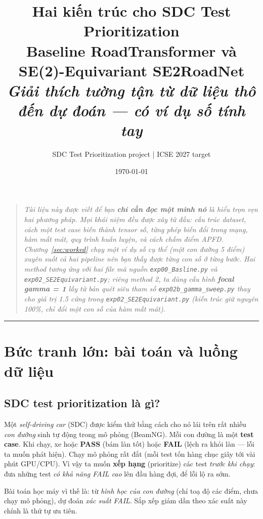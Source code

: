 \documentclass[11pt]{article}
\title{\vspace{-1.2cm}\textbf{Hai kiến trúc cho SDC Test Prioritization}\\[4pt]
\large Baseline \textcolor{cA}{RoadTransformer} \;và\; SE(2)-Equivariant
\textcolor{cB}{SE2RoadNet}\\[2pt]
\normalsize\textit{Giải thích tường tận từ dữ liệu thô đến dự đoán --- có ví dụ số tính tay}}
\author{\normalsize SDC Test Prioritization project \;|\; ICSE 2027 target}
\date{\normalsize\today}
\newcommand{\code}[1]{\textcolor{cInk}{\texttt{#1}}}
\newcommand{\fileA}{\code{exp00\_Basline.py}}
\newcommand{\fileB}{\code{exp02\_SE2Equivariant.py}}
\newcommand{\fileBb}{\code{exp02b\_gamma\_sweep.py}}
\theoremstyle{definition}
\begin{document}
\maketitle
\thispagestyle{empty}

\begin{quote}\small\itshape
Tài liệu này được viết để bạn \textbf{chỉ cần đọc một mình nó} là hiểu trọn vẹn
hai phương pháp. Mọi khái niệm đều được xây từ đầu: cấu trúc dataset, cách một
test case biến thành tensor số, từng phép biến đổi trong mạng, hàm mất mát, quy
trình huấn luyện, và cách chấm điểm APFD. Chương~\ref{sec:worked} chạy \emph{một
ví dụ số cụ thể} (một con đường 5 điểm) xuyên suốt cả hai pipeline nên bạn thấy
được từng con số ở từng bước. Hai method tương ứng với hai file mã nguồn
\fileA{} và \fileB{}; riêng method 2, ta dùng cấu hình \textbf{focal gamma = 1}
lấy từ bản quét siêu tham số \fileBb{} thay cho giá trị 1.5 cứng trong \fileB{}
(kiến trúc giữ nguyên 100\%, chỉ đổi một con số của hàm mất mát).
\end{quote}

\tableofcontents
\vspace{4mm}
\hrule
\vspace{4mm}

\section{Bức tranh lớn: bài toán và luồng dữ liệu}
\label{sec:overview}

\subsection{SDC test prioritization là gì?}
Một \emph{self-driving car} (SDC) được kiểm thử bằng cách cho nó lái trên rất
nhiều \emph{con đường} sinh tự động trong mô phỏng (BeamNG). Mỗi con đường là
một \textbf{test case}. Khi chạy, xe hoặc \textbf{PASS} (bám làn tốt) hoặc
\textbf{FAIL} (lệch ra khỏi làn --- lỗi ta muốn phát hiện). Chạy mô phỏng rất
đắt (mỗi test tốn hàng chục giây tới vài phút GPU/CPU). Vì vậy ta muốn
\textbf{xếp hạng} (prioritize) các test \emph{trước khi chạy}: đưa những test
\emph{có khả năng FAIL cao} lên đầu hàng đợi, để lỗi lộ ra sớm.

Bài toán học máy vì thế là: từ \emph{hình học của con đường} (chỉ toạ độ các
điểm, chưa chạy mô phỏng), dự đoán \emph{xác suất FAIL}. Sắp xếp giảm dần theo
xác suất này chính là thứ tự ưu tiên.
\end{document}
